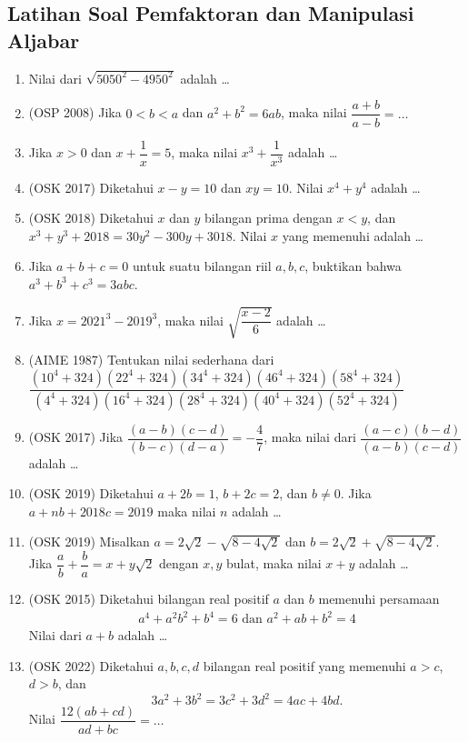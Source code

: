 \subsection{Latihan Soal Pemfaktoran dan Manipulasi Aljabar}
\begin{enumerate}
    \item  Nilai dari $\sqrt{5050^2-4950^2}$ adalah \dots

    \item (OSP 2008) Jika $0 < b < a$ dan $a^2+b^2=6ab$, maka nilai $\dfrac{a+b}{a-b}=\dots$
    
    \item Jika $x > 0$ dan $x + \dfrac{1}{x} =  5$, maka nilai $x^3+\dfrac{1}{x^3}$ adalah \dots
    
    \item (OSK 2017) Diketahui $x-y=10$ dan $xy=10$. Nilai $x^4+y^4$ adalah \dots
    
    \item (OSK 2018) Diketahui $x$ dan $y$ bilangan prima dengan $x < y$, dan $x^3+y^3+2018=30y^2-300y+3018$. Nilai $x$ yang memenuhi adalah \dots
    
    \item Jika $a+b+c=0$ untuk suatu bilangan riil $a,b,c$, buktikan bahwa $a^3+b^3+c^3=3abc$.
    
    \item Jika $x=2021^3-2019^3$, maka nilai $\sqrt{\dfrac{x-2}{6}}$ adalah \dots

    \item (AIME 1987)
    Tentukan nilai sederhana dari $\dfrac{(10^4+324)(22^4+324)(34^4+324)(46^4+324)(58^4+324)}{(4^4+324)(16^4+324)(28^4+324)(40^4+324)(52^4+324)}$

    \item (OSK 2017) Jika $\dfrac{(a-b)(c-d)}{(b-c)(d-a)}=-\dfrac{4}{7}$, maka nilai dari $\dfrac{(a-c)(b-d)}{(a-b)(c-d)}$ adalah \dots

    \item (OSK 2019) Diketahui $a+2b=1$, $b+2c=2$, dan $b \neq 0$. Jika $a+nb+2018c = 2019$ maka nilai $n$ adalah \dots

    \item (OSK 2019) Misalkan $a = 2\sqrt{2} - \sqrt{8-4\sqrt{2}}$ dan $b = 2\sqrt{2} + \sqrt{8-4\sqrt{2}}$. Jika $\dfrac{a}{b}+\dfrac{b}{a}=x+y\sqrt{2}$ dengan $x,y$ bulat, maka nilai $x+y$ adalah \dots

    \item (OSK 2015) Diketahui bilangan real positif $a$ dan $b$ memenuhi persamaan
    \begin{align*}
        a^4+a^2b^2+b^4=6 \text{ dan } a^2+ab+b^2=4
    \end{align*}
    Nilai dari $a + b$ adalah \ldots

    \item (OSK 2022) Diketahui $a,b,c,d$ bilangan real positif yang memenuhi $a>c$, $d>b$, dan 
    $$3a^2+3b^2=3c^2+3d^2=4ac+4bd.$$
    Nilai $\dfrac{12(ab+cd)}{ad+bc}=\dots$ 
\end{enumerate}